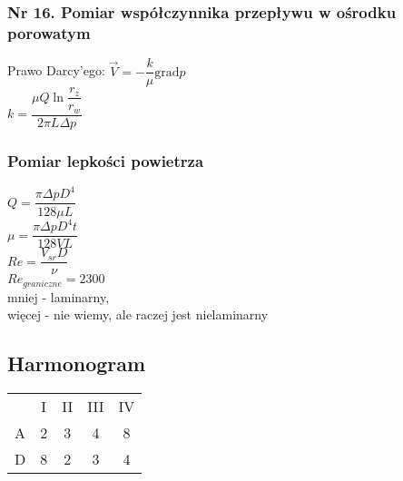\documentclass[a4paper,12pt]{article}
\begin{document}
\subsubsection{Nr 16. Pomiar współczynnika przepływu w ośrodku porowatym}
	Prawo Darcy'ego: $\vec{V}=-\dfrac{k}{\mu} \mathrm{grad}p$\\
	$k=\dfrac{\mu Q \ln{\dfrac{r_z}{r_w}}}{2\pi L \Delta p}$\\
\subsubsection{Pomiar lepkości powietrza}
	$Q=\dfrac{\pi \Delta p D^4}{128 \mu L}$\\
	$\mu=\dfrac{\pi \Delta p D^4 t}{128 VL}$\\
	$Re=\dfrac{V_{sr}D}{\nu}$\\
	$Re_{graniczne}=2300$\\
	mniej - laminarny,\\
	więcej - nie wiemy, ale raczej jest nielaminarny\\
\subsection{Harmonogram}
\begin{tabular}{c|c|c|c|c}
&I&II&III&IV\\
A&2&3&4&8\\
D&8&2&3&4\\
\end{tabular}
\end{document}
